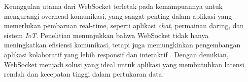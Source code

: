 Keunggulan utama dari WebSocket terletak pada kemampuannya untuk mengurangi overhead komunikasi, yang sangat penting dalam aplikasi yang memerlukan pembaruan real-time, seperti aplikasi \emph{chat}, permainan daring, dan sistem \emph{IoT}. Penelitian menunjukkan bahwa WebSocket tidak hanya meningkatkan efisiensi komunikasi, tetapi juga memungkinkan pengembangan aplikasi kolaboratif yang lebih responsif dan interaktif \cite{Milsap2019}. Dengan demikian, WebSocket menjadi solusi yang ideal untuk aplikasi yang membutuhkan latensi rendah dan kecepatan tinggi dalam pertukaran data.